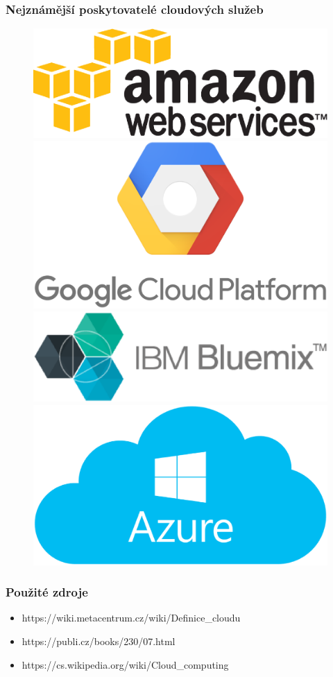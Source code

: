 \documentclass{beamer}
\begin{document}
\begin{frame}
	\frametitle{Nejznámější poskytovatelé cloudových služeb}	
	\begin{figure}[h]
		\includegraphics[scale=0.3]{amazon.eps}
		\includegraphics[scale=0.12]{google.eps} \\
		\includegraphics[scale=0.35]{ibm.eps}
		\includegraphics[scale=0.12]{azure.eps}
	\end{figure}
\end{frame}
\begin{frame}
  \frametitle{Použité zdroje}    
  \begin{itemize}
   \item https://wiki.metacentrum.cz/wiki/Definice\_cloudu
   \item https://publi.cz/books/230/07.html
   \item https://cs.wikipedia.org/wiki/Cloud\_computing
  \end{itemize}
\end{frame}
\end{document}
